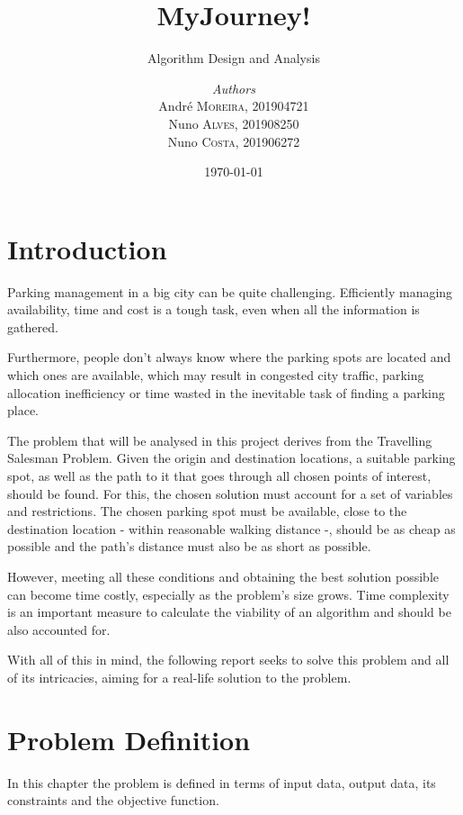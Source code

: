 \documentclass[a4paper, 12pt]{report}
\institute{Faculty Of Engineering, University Of Porto}
\subtitle{Algorithm Design and Analysis}
\title{MyJourney!}
\author{\textit{Authors}\\André \textsc{Moreira}, 201904721
        \\Nuno \textsc{Alves}, 201908250
        \\Nuno \textsc{Costa}, 201906272}
\date{\today}
\begin{document}
    \maketitle
    
    \romantableofcontents
    
    \chapter{Introduction} \label{intro}
    
    Parking management in a big city can be quite challenging. Efficiently managing availability, time and cost is a tough task, even when all the information is gathered.
    
    Furthermore, people don't always know where the parking spots are located and which ones are available, which may result in congested city traffic, parking allocation inefficiency or time wasted in the inevitable task of finding a parking place.
    
    The problem that will be analysed in this project derives from the Travelling Salesman Problem. Given the origin and destination locations, a suitable parking spot, as well as the path to it that goes through all chosen points of interest, should be found. For this, the chosen solution must account for a set of variables and restrictions. The chosen parking spot must be available, close to the destination location - within reasonable walking distance -, should be as cheap as possible and the path's distance must also be as short as possible.
    
    However, meeting all these conditions and obtaining the best solution possible can become time costly, especially as the problem's size grows. Time complexity is an important measure to calculate the viability of an algorithm and should be also accounted for.
    
    With all of this in mind, the following report seeks to solve this problem and all of its intricacies, aiming for a real-life solution to the problem.
    
    \newpage
    
    
    \chapter{Problem Definition} \label{pdef}
    
    In this chapter the problem is defined in terms of input data, output data, its constraints and the objective function. 
    
\end{document}
